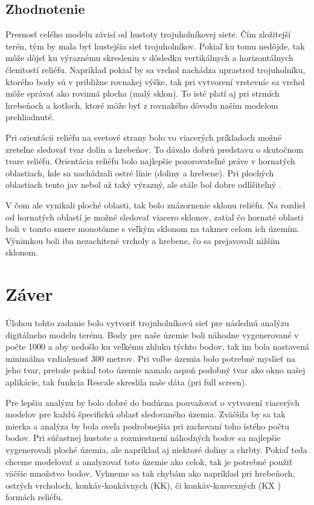 \documentclass[12pt]{article}
\begin{document}
\subsection*{Zhodnotenie}
Presnosť celého modelu závisí od hustoty trojuholníkovej siete. Čím zložitejší terén, tým by mala byť hustejšia sieť trojuholníkov. Pokiaľ ku tomu nedôjde, tak môže dôjsť ku výraznému skresleniu v dôsledku vertikálnych a horizontálnych členitostí reliéfu. Napríklad pokiaľ by sa vrchol nachádza uprastred trojuholníku, ktorého body sú v približne rovnakej výške, tak pri vytvorení vrstevníc sa vrchol môže správať ako rovinná plocha (malý sklon). To isté platí aj pri strmích hrebeňoch a kotloch, ktoré môže byť z rovnakého dôvodu naším modelom prehliadnuté. \par
Pri orientácii reliéfu na svetové strany bolo vo viacerých príkladoch možné zreteľne  sledovať tvar dolín a hrebeňov. To dávalo dobrú predstavu o skutočnom tvare reliéfu. Orientácia reliéfu bolo najlepšie pozorovateľné práve v hornatých oblastiach, kde sa nachádzali ostré línie (doliny a hrebene). Pri plochých oblastiach tento jav nebol až taký výrazný, ale stále bol dobre odlíšiteľný .\par
V čom ale vynikali ploché oblasti, tak bolo znázornenie sklonu reliéfu. Na rozdiel od hornatých oblastí je možné sledovať viacero sklonov, zatiaľ čo hornaté oblasti boli v tomto smere monotónne s veľkým sklonom na takmer celom ich územím. Výnimkou boli iba nezachitené vrcholy a hrebene, čo sa prejavovali nižším sklonom.




\newpage
\section*{Záver}
Úlohou tohto zadanie bolo vytvoriť trojuholníkovú sieť pre následnú analýzu digitálneho modelu terénu. Body pre naše územie boli náhodne vygenerované v počte 1000 a aby nedošlo ku veľkému zhluku týchto bodov, tak im bola nastavená minimálna vzdialenosť 300 metrov. Pri voľbe územia bolo potrebné myslieť na jeho tvar, pretože pokiaľ toto územie namalo aspoň podobný tvar ako okno našej aplikácie, tak funkcia Rescale skreslila naše dáta (pri full screen). \par Pre lepšiu analýzu by bolo dobré do budúcna pouvažovať o vytvorení viacerých modelov pre každú špecifickú oblasť sledovaného územia. Zväčšila by sa tak mierka a analýza by bola oveľa podrobnejšia pri zachovaní toho ístého počtu bodov. Pri súčastnej hustote a rozmiestnení náhodných bodov sa najlepšie vygenerovali ploché územia, ale napríklad aj niektoré doliny a chrbty. Pokiaľ teda chceme modelovať a analyzovať toto územie ako celok, tak je potrebné použiť väčšie množstvo bodov. Vyhneme sa tak chybám  ako napríklad pri hrebeňoch, ostrých vrcholoch, konkáv-konkávnych (KK), či  konkáv-konvexných  (KX ) formách reliéfu.
\newpage
\end{document}
